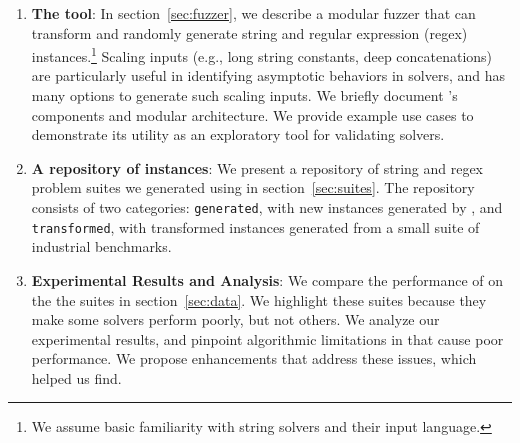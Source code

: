 \begin{enumerate}
    \item \textbf{The \fuzzer{} tool}:
        In section~\ref{sec:fuzzer}, we describe a modular fuzzer that can
        transform and randomly generate \smtfull{} string and regular
        expression (regex) instances.\footnote{We assume basic
        familiarity with string solvers and their input
        language.} Scaling inputs (e.g., long string constants,
        deep concatenations) are particularly useful in identifying asymptotic
        behaviors in solvers, and \fuzzer{} has many options to generate such
        scaling inputs. We briefly document \fuzzer{}'s
        components and modular architecture. We provide example use cases to
        demonstrate its utility as an exploratory tool for validating
        solvers.

    \item \textbf{A repository of \smtfull{} instances}:
        We present a repository of \smtfull{} string and regex problem suites
        we generated using \fuzzer{} in section~\ref{sec:suites}. The
        repository consists of two categories: \texttt{generated}, with new
        instances generated by \fuzzer{}, and \texttt{transformed}, with
        transformed instances generated from a small suite of industrial
        benchmarks.

    \item \textbf{Experimental Results and Analysis}:
        We compare the performance of \theSolvers{} on the
        the \fuzzer{} suites \theSuites{} in section~\ref{sec:data}. We
        highlight these suites because they make some solvers perform poorly,
        but not others. We analyze our
        experimental results, and pinpoint algorithmic limitations
        in \us{} that cause poor performance. We propose enhancements that
        address these issues, which \fuzzer{} helped us find.
\end{enumerate}
